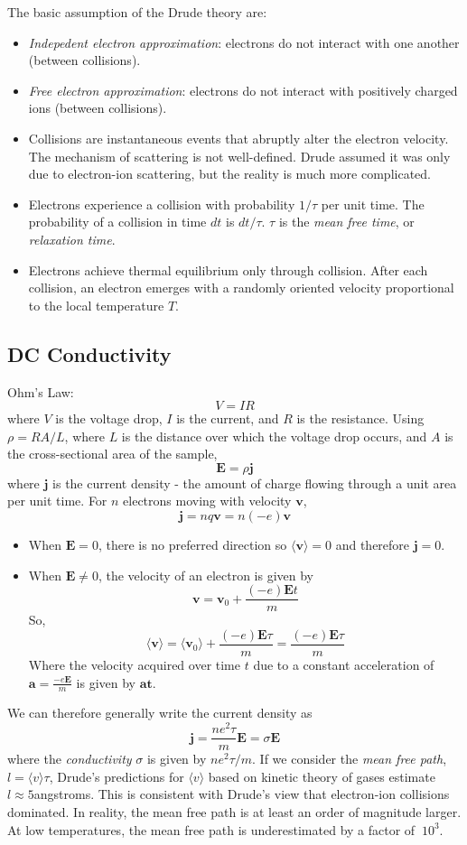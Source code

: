 \documentclass[10pt]{article}
\begin{document}
The basic assumption of the Drude theory are:
\begin{itemize}
  \item \emph{Indepedent electron approximation}: electrons do not interact with one another (between collisions).
  \item \emph{Free electron approximation}: electrons do not interact with positively charged ions (between collisions).
  \item Collisions are instantaneous events that abruptly alter the electron velocity. The mechanism of scattering is not
  well-defined. Drude assumed it was only due to electron-ion scattering, but the reality is much more complicated.
  \item Electrons experience a collision with probability $1/\tau$ per unit time. The probability of a collision in time $dt$
  is $dt/\tau$. $\tau$ is the \emph{mean free time}, or \emph{relaxation time}.
  \item Electrons achieve thermal equilibrium only through collision. After each collision, an electron emerges with a randomly oriented
  velocity proportional to the local temperature $T$.
\end{itemize}

\subsection{DC Conductivity}
Ohm's Law:
$$V = IR$$
where $V$ is the voltage drop, $I$ is the current, and $R$ is the resistance. Using $\rho = RA/L$, where $L$ is the
distance over which the voltage drop occurs, and $A$ is the cross-sectional area of the sample,
$$\textbf{E} = \rho \textbf{j} $$
where $\textbf{j}$ is the current density - the amount of charge flowing through a unit area per unit time.
For $n$ electrons moving with velocity $\textbf{v}$,
$$
\textbf{j} = nq\textbf{v} = n(-e)\textbf{v}
$$
\begin{itemize}
  \item When $\textbf{E} = 0$, there is no preferred direction so $\langle \textbf{v} \rangle = 0$ and therefore $\textbf{j} = 0$.
  \item When $\textbf{E} \neq 0$, the velocity of an electron is given by
  $$ \textbf{v} = \textbf{v}_{0} + \frac{(-e)\textbf{E}t}{m}$$
  So,
  $$ \langle \textbf{v} \rangle = \langle \textbf{v}_{0} \rangle + \frac{(-e)\textbf{E}\tau}{m} = \frac{(-e)\textbf{E}\tau}{m} $$
  Where the velocity acquired over time $t$ due to a constant acceleration of $\textbf{a} = \frac{-e\textbf{E}}{m}$ is given by $\textbf{at}$.
\end{itemize}
We can therefore generally write the current density as
$$\textbf{j} = \frac{ne^{2}\tau}{m} \textbf{E}= \sigma \textbf{E} $$
where the \emph{conductivity} $\sigma$ is given by $ne^{2}\tau/m$.
If we consider the \emph{mean free path}, $l = \langle v\rangle \tau$, Drude's predictions for $\langle v\rangle$ based on kinetic theory
of gases estimate $l \approx 5 $angstroms. This is consistent with Drude's view that electron-ion collisions dominated. In reality, the mean free
path is at least an order of magnitude larger. At low temperatures, the mean free path is underestimated by a factor of $~10^{3}$.
\end{document}
